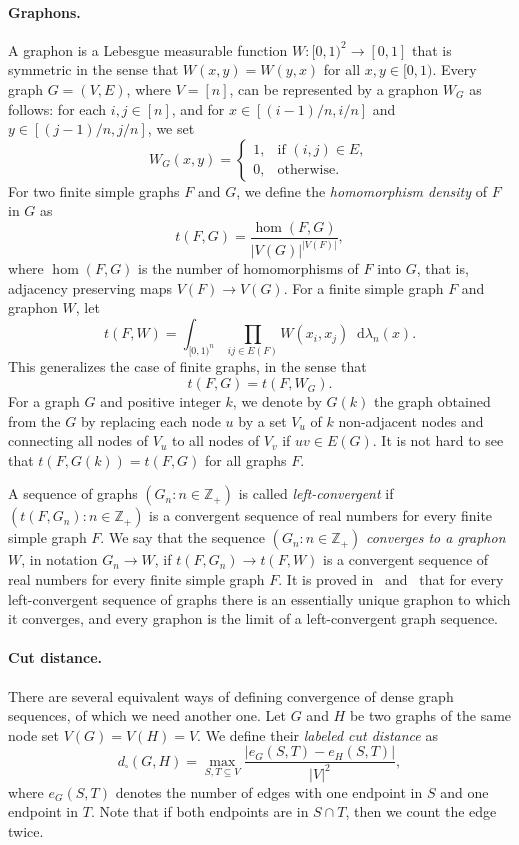 \documentclass[10pt]{article}
\theoremstyle{plain}
\theoremstyle{definition}
\newcommand*\diff{\mathop{}\!\mathrm{d}}
\newcommand{\bbZ}{\mathbb{Z}}
\begin{document}
\paragraph{Graphons.} A graphon is a Lebesgue measurable function $W\colon [0,1)^2\to[0,1]$ that is
symmetric in the sense that $W(x,y)=W(y,x)$ for all $x,y\in[0,1)$. Every graph $G=(V,E)$, where $V=[n]$, can be represented
by a graphon $W_G$ as follows: for each $i,j\in[n]$, and for $x\in [(i-1)/n,i/n]$ and $y\in [(j-1)/n,j/n]$, we set
\[
W_G(x,y)=
  \begin{cases}
    1, & \text{if $(i,j)\in E$}, \\
    0, & \text{otherwise}.
  \end{cases}
\]
For two finite simple graphs $F$ and $G$, we define the {\it homomorphism
density} of $F$ in $G$ as
\[
t(F,G)=\frac{\hom(F,G)}{|V(G)|^{|V(F)|}},
\]
where $\hom(F,G)$ is the number of homomorphisms of $F$ into $G$, that is, adjacency preserving maps $V(F)\to V(G)$. For a finite simple graph $F$ and graphon $W$, let
\[
t(F,W)=\int_{[0,1)^n} \prod_{ij\in E(F)} W(x_i,x_j)\diff\lambda_n(x).
\]
This generalizes the case of finite graphs, in the sense that
\[
t(F,G)=t(F,W_G).
\]
For a graph $G$ and positive integer $k$, we denote by $G(k)$ the graph obtained from the $G$ by replacing each node $u$
by a set $V_u$ of $k$ non-adjacent nodes and connecting all nodes of $V_u$ to all nodes of $V_v$ if $uv \in E(G)$. It is not hard to see that $t(F,G(k))=t(F,G)$ for all graphs $F$. 

A sequence of graphs $(G_n\colon n\in\bbZ_+)$ is called {\it left-convergent} if
$(t(F,G_n)\colon n\in\bbZ_+)$ is a convergent sequence of real numbers for every
finite simple graph $F$. We say that the sequence $(G_n\colon n\in\bbZ_+)$ {\it converges to a
graphon $W$}, in notation $G_n\to W$, if $t(F,G_n)\to t(F,W)$ is a convergent
sequence of real numbers for every finite simple graph $F$. It is proved 
in~\cite{LSzlimit} and~\cite{BCLunique} that for every left-convergent sequence of
graphs there is an essentially unique graphon to which it converges, and every
graphon is the limit of a left-convergent graph sequence.

\paragraph{Cut distance.} 
There are several equivalent ways of defining convergence of dense graph sequences, of which we need another one.
Let $G$ and $H$ be two graphs of the same node set $V(G)=V(H)=V$. We define their {\it labeled cut distance} as
\[
d_\square(G,H)=\max_{S,T\subseteq V}\frac{|e_G(S,T)-e_H(S,T)|}{|V|^2},
\]
where $e_G(S,T)$ denotes the number of edges with one endpoint in $S$ and one endpoint in $T$. Note that if both endpoints are in $S\cap T$, then we count the edge twice.
\end{document}
